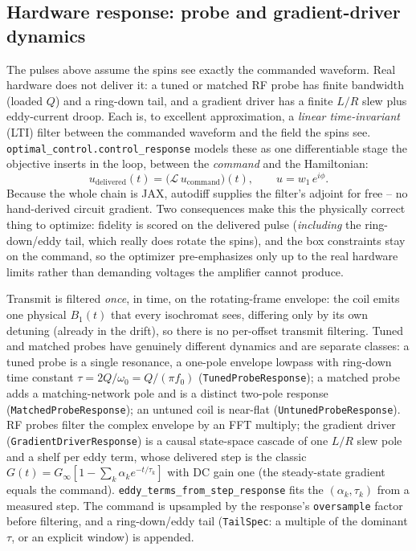 \documentclass[11pt,oneside]{report}
\newcommand{\code}[1]{\texttt{#1}}
\begin{document}
\subsection{Hardware response: probe and gradient-driver dynamics}
\label{sec:grape-hardware-response}

The pulses above assume the spins see exactly the commanded waveform. Real
hardware does not deliver it: a tuned or matched RF probe has finite bandwidth
(loaded \(Q\)) and a ring-down tail, and a gradient driver has a finite
\(L/R\) slew plus eddy-current droop. Each is, to excellent approximation, a
\emph{linear time-invariant} (LTI) filter between the commanded waveform and
the field the spins see. \code{optimal\_control.control\_response} models these
as one differentiable stage the objective inserts in the loop, between the
\emph{command} and the Hamiltonian:
\[
  u_\text{delivered}(t) = \big(\mathcal{L}\,u_\text{command}\big)(t),
  \qquad u = w_1\,e^{i\phi}.
\]
Because the whole chain is JAX, autodiff supplies the filter's adjoint for free
-- no hand-derived circuit gradient. Two consequences make this the physically
correct thing to optimize: fidelity is scored on the delivered pulse
(\emph{including} the ring-down/eddy tail, which really does rotate the spins),
and the box constraints stay on the command, so the optimizer pre-emphasizes
only up to the real hardware limits rather than demanding voltages the amplifier
cannot produce.

Transmit is filtered \emph{once}, in time, on the rotating-frame envelope: the
coil emits one physical \(B_1(t)\) that every isochromat sees, differing only by
its own detuning (already in the drift), so there is no per-offset transmit
filtering. Tuned and matched probes have genuinely different dynamics and are
separate classes: a tuned probe is a single resonance, a one-pole envelope
lowpass with ring-down time constant \(\tau = 2Q/\omega_0 = Q/(\pi f_0)\)
(\code{TunedProbeResponse}); a matched probe adds a matching-network pole and is
a distinct two-pole response (\code{MatchedProbeResponse}); an untuned coil is
near-flat (\code{UntunedProbeResponse}). RF probes filter the complex envelope by
an FFT multiply; the gradient driver
(\code{GradientDriverResponse}) is a causal state-space cascade of one \(L/R\)
slew pole and a shelf per eddy term, whose delivered step is the classic
\(G(t)=G_\infty[1-\sum_k \alpha_k e^{-t/\tau_k}]\) with DC gain one (the
steady-state gradient equals the command). \code{eddy\_terms\_from\_step\_response}
fits the \((\alpha_k,\tau_k)\) from a measured step. The command is upsampled by
the response's \code{oversample} factor before filtering, and a ring-down/eddy
tail (\code{TailSpec}: a multiple of the dominant \(\tau\), or an explicit
window) is appended.
\end{document}
